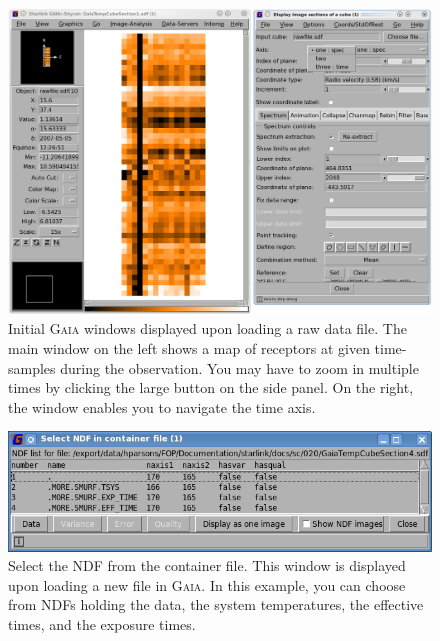 \documentclass[11pt,oneside,chapters]{starlink}
\begin{document}
\begin{figure}[h!]
\begin{center}
\includegraphics[width=0.9\linewidth]{sc20_gaia1}
\caption[\gaia\ main window.]{\label{fig:rawgaia}
  Initial \textsc{Gaia} windows displayed upon loading a raw
  data file. The main window on the left shows a map of receptors at
  given time-samples during the observation. You may have to zoom in
  multiple times by clicking the large  button on the side
  panel. On the right, the 
  window enables you to navigate the time axis.}
\end{center}
\end{figure}


\begin{figure}[h!]
\begin{center}
\includegraphics[width=0.7\linewidth]{sc20_gaia3}
\caption[\gaia\ select NDF in container file]{\label{fig:ndfgaia}
  Select the NDF from the container file.  This window is displayed upon
  loading a new file in \textsc{Gaia}.  In this example, you can choose
  from NDFs holding the data, the system temperatures, the effective
  times, and the exposure times.}
\end{center}
\end{figure}
\end{document}
